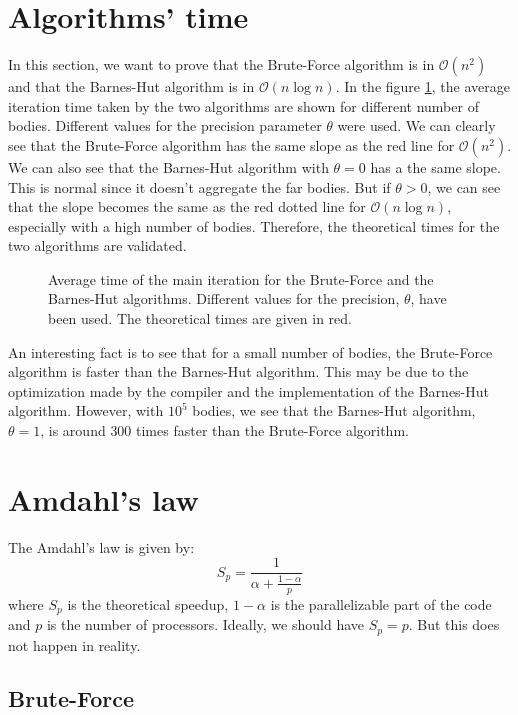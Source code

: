 \documentclass[11pt,a4paper]{article}
\begin{document}
\section{Algorithms' time}

In this section, we want to prove that the Brute-Force algorithm is in $\mathcal{O}(n^2)$ and that the Barnes-Hut algorithm is in $\mathcal{O}(n\log n)$. In the figure \ref{fig:algo_time}, the average iteration time taken by the two algorithms are shown for different number of bodies. Different values for the precision parameter $\theta$ were used. We can clearly see that the Brute-Force algorithm has the same slope as the red line for $\mathcal{O}(n^2)$. We can also see that the Barnes-Hut algorithm with $\theta=0$ has a the same slope. This is normal since it doesn't aggregate the far bodies. But if $\theta>0$, we can see that the slope becomes the same as the red dotted line for $\mathcal{O}(n\log n)$, especially with a high number of bodies. Therefore, the theoretical times for the two algorithms are validated.

\begin{figure}[H]
\centering

\caption{\label{fig:algo_time} Average time of the main iteration for the Brute-Force and the Barnes-Hut algorithms. Different values for the precision, $\theta$, have been used. The theoretical times are given in red.}
\end{figure}

An interesting fact is to see that for a small number of bodies, the Brute-Force algorithm is faster than the Barnes-Hut algorithm. This may be due to the optimization made by the compiler and the implementation of the Barnes-Hut algorithm. However, with $10^5$ bodies, we see that the Barnes-Hut algorithm, $\theta=1$, is around $300$ times faster than the Brute-Force algorithm.

\section{Amdahl's law}

The Amdahl's law is given by:
\begin{equation}
S_{p} = \frac{1}{\alpha + \frac{1-\alpha}{p}}
\end{equation}
where $S_{p}$ is the theoretical speedup, $1-\alpha$ is the parallelizable part of the code and $p$ is the number of processors. Ideally, we should have $S_p = p$. But this does not happen in reality.

\subsection{Brute-Force}
\end{document}
